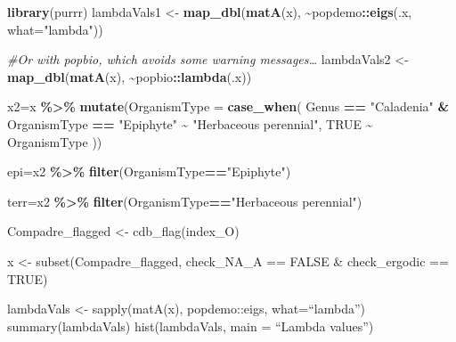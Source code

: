 \documentclass[
]{book}
\newenvironment{Shaded}{\begin{snugshade}}{\end{snugshade}}
\newcommand{\AttributeTok}[1]{\textcolor[rgb]{0.13,0.29,0.53}{#1}}
\newcommand{\CommentTok}[1]{\textcolor[rgb]{0.56,0.35,0.01}{\textit{#1}}}
\newcommand{\ConstantTok}[1]{\textcolor[rgb]{0.56,0.35,0.01}{#1}}
\newcommand{\FunctionTok}[1]{\textcolor[rgb]{0.13,0.29,0.53}{\textbf{#1}}}
\newcommand{\NormalTok}[1]{#1}
\newcommand{\OtherTok}[1]{\textcolor[rgb]{0.56,0.35,0.01}{#1}}
\newcommand{\SpecialCharTok}[1]{\textcolor[rgb]{0.81,0.36,0.00}{\textbf{#1}}}
\newcommand{\StringTok}[1]{\textcolor[rgb]{0.31,0.60,0.02}{#1}}
\theoremstyle{definition}
\theoremstyle{definition}
\theoremstyle{definition}
\theoremstyle{definition}
\theoremstyle{remark}
\begin{document}
\begin{Shaded}
\begin{Highlighting}[]
\FunctionTok{library}\NormalTok{(purrr)}
\NormalTok{lambdaVals1 }\OtherTok{\textless{}{-}} \FunctionTok{map\_dbl}\NormalTok{(}\FunctionTok{matA}\NormalTok{(x), }\SpecialCharTok{\textasciitilde{}}\NormalTok{popdemo}\SpecialCharTok{::}\FunctionTok{eigs}\NormalTok{(.x, }\AttributeTok{what=}\StringTok{"lambda"}\NormalTok{))}
 
 
\CommentTok{\#Or with popbio, which avoids some warning messages…}
\NormalTok{lambdaVals2 }\OtherTok{\textless{}{-}} \FunctionTok{map\_dbl}\NormalTok{(}\FunctionTok{matA}\NormalTok{(x), }\SpecialCharTok{\textasciitilde{}}\NormalTok{popbio}\SpecialCharTok{::}\FunctionTok{lambda}\NormalTok{(.x))}
\end{Highlighting}
\end{Shaded}

\begin{Shaded}
\begin{Highlighting}[]
\NormalTok{x2}\OtherTok{=}\NormalTok{x }\SpecialCharTok{\%\textgreater{}\%} 
  \FunctionTok{mutate}\NormalTok{(}\AttributeTok{OrganismType =} \FunctionTok{case\_when}\NormalTok{(}
\NormalTok{    Genus }\SpecialCharTok{==}  \StringTok{"Caladenia"} \SpecialCharTok{\&}\NormalTok{ OrganismType }\SpecialCharTok{==} \StringTok{"Epiphyte"} \SpecialCharTok{\textasciitilde{}} \StringTok{"Herbaceous perennial"}\NormalTok{,}
    \ConstantTok{TRUE} \SpecialCharTok{\textasciitilde{}}\NormalTok{ OrganismType}
\NormalTok{  ))}

\NormalTok{epi}\OtherTok{=}\NormalTok{x2 }\SpecialCharTok{\%\textgreater{}\%} 
  \FunctionTok{filter}\NormalTok{(OrganismType}\SpecialCharTok{==}\StringTok{"Epiphyte"}\NormalTok{)}

\NormalTok{terr}\OtherTok{=}\NormalTok{x2 }\SpecialCharTok{\%\textgreater{}\%} 
  \FunctionTok{filter}\NormalTok{(OrganismType}\SpecialCharTok{==}\StringTok{"Herbaceous perennial"}\NormalTok{)}
\end{Highlighting}
\end{Shaded}

Compadre\_flagged \textless- cdb\_flag(index\_O)

x \textless- subset(Compadre\_flagged, check\_NA\_A == FALSE \& check\_ergodic == TRUE)

lambdaVals \textless- sapply(matA(x), popdemo::eigs, what=``lambda'')
summary(lambdaVals)
hist(lambdaVals, main = ``Lambda values'')
\end{document}
